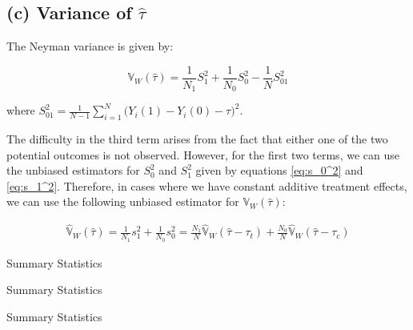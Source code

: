 \documentclass[11pt]{article}
\numberwithin{equation}{section}
\newcommand{\Var}{\mathbb{V}}
\begin{document}
\subsection*{(c) Variance of $\hat{\tau}$} 

The Neyman variance is given by:

\begin{equation}
    \Var_W(\hat\tau) = \frac{1}{N_1}S_1^2 + \frac{1}{N_0}S_0^2 - \frac{1}{N}S_{01}^2
\end{equation}

where $S_{01}^2 = \frac{1}{N-1}\sum_{i=1}^N \biggl(Y_i(1) - Y_i(0) - \tau \biggr)^2$.

The difficulty in the third term arises from the fact that either one of the two potential outcomes is not observed.
However, for the first two terms, we can use the unbiased estimators for $S_0^2$ and $S_1^2$ given by equations \eqref{eq:s_0^2} and \eqref{eq:s_1^2}.
Therefore, in cases where we have constant additive treatment effects, we can use the following unbiased estimator for $\Var_W(\hat\tau)$:

\begin{align}
    \hat{\Var}_W(\hat\tau) = \frac{1}{N_1}s_1^2 + \frac{1}{N_0}s_0^2  = \frac{N_1}{N}\hat{\Var}_W(\hat\tau - \tau_t) + \frac{N_0}{N}\hat{\Var}_W(\hat\tau - \tau_c)
\end{align}



\appendix
\setcounter{figure}{0}                      
\setcounter{table}{0}                      
\renewcommand\thefigure{A.\arabic{figure}} 
\renewcommand\thetable{A.\arabic{table}} 

\begin{table}
    \centering
    \tiny
    
    \caption{\label{tab:summary_stats}Summary Statistics}
\end{table}


\begin{table}
    \centering
    \tiny
    
    \caption{\label{tab:summary_stats(control_group)}Summary Statistics}
\end{table}


\begin{table}
    \centering
    \tiny
    
    \caption{\label{tab:summary_stats(treated_group)}Summary Statistics}
\end{table}


\printbibliography
\end{document}
